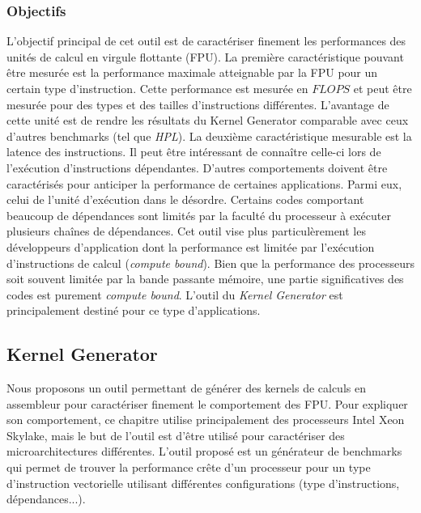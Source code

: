        
 
        

    
    \subsubsection{Objectifs}
    
        L'objectif principal de cet outil est de caractériser finement les performances des unités de calcul en virgule flottante (FPU). 
        La première caractéristique pouvant être mesurée est la performance maximale atteignable par la FPU pour un certain type d'instruction. Cette performance est mesurée en $FLOPS$ et peut être mesurée pour des types et des tailles d'instructions différentes. L'avantage de cette unité est de rendre les résultats du Kernel Generator comparable avec ceux d'autres benchmarks (tel que \textit{HPL}). 
        La deuxième caractéristique mesurable est la latence des instructions. Il peut être intéressant de connaître celle-ci lors de l'exécution d'instructions dépendantes.
        D'autres comportements doivent être caractérisés pour anticiper la performance de certaines applications. Parmi eux, celui de l'unité d'exécution dans le désordre. Certains codes comportant beaucoup de dépendances sont limités par la faculté du processeur à exécuter plusieurs chaînes de dépendances. Cet outil vise plus particulèrement les développeurs d'application dont la performance est limitée par l'exécution d'instructions de calcul (\textit{compute bound}). Bien que la performance des processeurs soit souvent limitée par la bande passante mémoire, une partie significatives des codes est purement \textit{compute bound}. L'outil du \textit{Kernel Generator} est principalement destiné pour ce type d'applications.


        
\subsection{Kernel Generator}    

        Nous proposons un outil permettant de générer des kernels de calculs en assembleur pour caractériser finement le comportement des FPU. Pour expliquer son comportement, ce chapitre utilise principalement des processeurs Intel Xeon Skylake, mais le but de l'outil est d'être utilisé pour caractériser des microarchitectures différentes. 
        L'outil proposé est un générateur de benchmarks qui permet de trouver la performance crête d'un processeur pour un type d'instruction vectorielle utilisant différentes configurations (type d'instructions, dépendances...).
        
